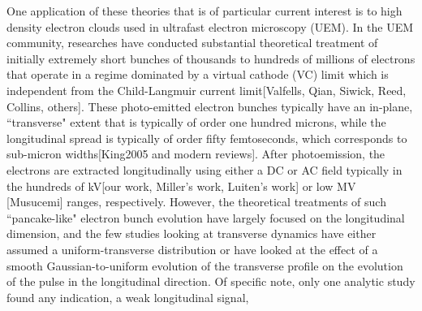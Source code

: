 \documentclass[aps,prl,twocolumn,showpacs,superscriptaddress,groupedaddress]{revtex4-1}  %
\begin{document}
One application of these theories that is of particular current interest is to 
high density electron clouds used in ultrafast electron microscopy (UEM).  
In the UEM community, researches have conducted substantial theoretical treatment of initially 
extremely short bunches of thousands to hundreds of millions of electrons that operate in a regime dominated
by a virtual cathode (VC) limit which is independent from
the Child-Langmuir current limit[Valfells, Qian, Siwick, Reed, Collins, others].  These photo-emitted electron bunches
typically have an in-plane, ``transverse" extent 
that is typically of order one hundred microns, while the  longitudinal 
spread is typically of order fifty femtoseconds, which corresponds to sub-micron widths[King2005 and modern reviews].  
After photoemission, 
the electrons are extracted longitudinally using either a DC 
or AC field typically in the hundreds of kV[our work, Miller's work, Luiten's work] or low MV [Musucemi] ranges, respectively.   However, the theoretical 
treatments of such ``pancake-like" electron 
bunch evolution have largely focused on the longitudinal dimension, 
and the few studies looking at transverse dynamics have either assumed a uniform-transverse
distribution \cite{Collin:2005_broadening} or have looked at the effect of a smooth Gaussian-to-uniform evolution of the transverse profile
on the evolution of the pulse in the longitudinal direction\cite{Reed:2006_short_pulse_theory}.  
Of specific note, only one analytic study found any indication, a weak longitudinal signal,
\end{document}
